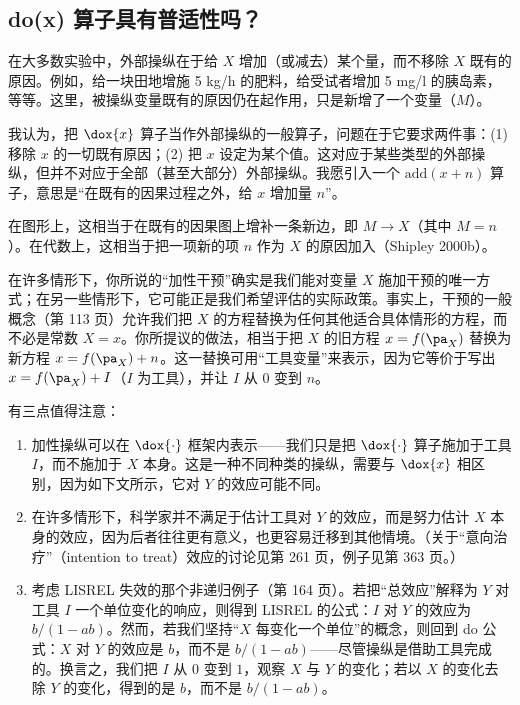 \subsection{do(x) 算子具有普适性吗？}


在大多数实验中，外部操纵在于给 $X$ 增加（或减去）某个量，而不移除 $X$ 既有的原因。例如，给一块田地增施 5 kg/h 的肥料，给受试者增加 5 mg/l 的胰岛素，等等。这里，被操纵变量既有的原因仍在起作用，只是新增了一个变量（$M$）。

我认为，把 $\dox{x}$ 算子当作外部操纵的一般算子，问题在于它要求两件事：(1) 移除 $x$ 的一切既有原因；(2) 把 $x$ 设定为某个值。这对应于某些类型的外部操纵，但并不对应于全部（甚至大部分）外部操纵。我愿引入一个 $\mathrm{add}(x+n)$ 算子，意思是“在既有的因果过程之外，给 $x$ 增加量 $n$”。

在图形上，这相当于在既有的因果图上增补一条新边，即 $M\to X$（其中 $M=n$）。在代数上，这相当于把一项新的项 $n$ 作为 $X$ 的原因加入（Shipley 2000b）。


在许多情形下，你所说的“加性干预”确实是我们能对变量 $X$ 施加干预的唯一方式；在另一些情形下，它可能正是我们希望评估的实际政策。事实上，干预的一般概念（第 113 页）允许我们把 $X$ 的方程替换为任何其他适合具体情形的方程，而不必是常数 $X=x$。你所提议的做法，相当于把 $X$ 的旧方程 $x=f(\pa_X)$ 替换为新方程 $x=f(\pa_X)+n$。这一替换可用“工具变量”来表示，因为它等价于写出 $x=f(\pa_X)+I$（$I$ 为工具），并让 $I$ 从 $0$ 变到 $n$。

有三点值得注意：

\begin{enumerate}[label=\arabic*.,leftmargin=1.8em]
\item 加性操纵可以在 $\dox{\cdot}$ 框架内表示——我们只是把 $\dox{\cdot}$ 算子施加于工具 $I$，而不施加于 $X$ 本身。这是一种不同种类的操纵，需要与 $\dox{x}$ 相区别，因为如下文所示，它对 $Y$ 的效应可能不同。
\item 在许多情形下，科学家并不满足于估计工具对 $Y$ 的效应，而是努力估计 $X$ 本身的效应，因为后者往往更有意义，也更容易迁移到其他情境。（关于“意向治疗”（intention to treat）效应的讨论见第 261 页，例子见第 363 页。）
\item 考虑 LISREL 失效的那个非递归例子（第 164 页）。若把“总效应”解释为 $Y$ 对工具 $I$ 一个单位变化的响应，则得到 LISREL 的公式：$I$ 对 $Y$ 的效应为 $b/(1-ab)$。然而，若我们坚持“$X$ 每变化一个单位”的概念，则回到 do 公式：$X$ 对 $Y$ 的效应是 $b$，而不是 $b/(1-ab)$——尽管操纵是借助工具完成的。换言之，我们把 $I$ 从 $0$ 变到 $1$，观察 $X$ 与 $Y$ 的变化；若以 $X$ 的变化去除 $Y$ 的变化，得到的是 $b$，而不是 $b/(1-ab)$。
\end{enumerate}

